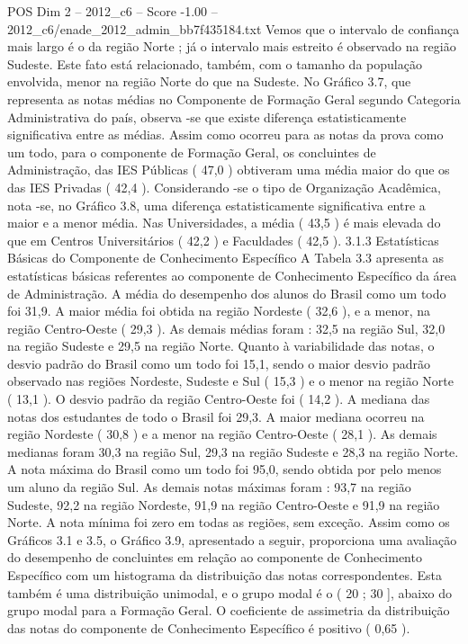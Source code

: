 \begin{textsample}{POS Dim 2 – 2012\_c6 – Score -1.00 – 2012\_c6/enade\_2012\_admin\_bb7f435184.txt}
Vemos que o intervalo de confiança mais largo é o da região Norte ; já o intervalo mais estreito é observado na região Sudeste.
Este fato está relacionado, também, com o tamanho da população envolvida, menor na região Norte do que na Sudeste.
No Gráfico 3.7, que representa as notas médias no Componente de Formação Geral segundo Categoria Administrativa do país, observa -se que existe diferença estatisticamente significativa entre as médias.
Assim como ocorreu para as notas da prova como um todo, para o componente de Formação Geral, os concluintes de Administração, das IES Públicas ( 47,0 ) obtiveram uma média maior do que os das IES Privadas ( 42,4 ).
Considerando -se o tipo de Organização Acadêmica, nota -se, no Gráfico 3.8, uma diferença estatisticamente significativa entre a maior e a menor média.
Nas Universidades, a média ( 43,5 ) é mais elevada do que em Centros Universitários ( 42,2 ) e Faculdades ( 42,5 ). 3.1.3 Estatísticas Básicas do Componente de Conhecimento Específico A Tabela 3.3 apresenta as estatísticas básicas referentes ao componente de Conhecimento Específico da área de Administração.
A média do desempenho dos alunos do Brasil como um todo foi 31,9.
A maior média foi obtida na região Nordeste ( 32,6 ), e a menor, na região Centro-Oeste ( 29,3 ).
As demais médias foram : 32,5 na região Sul, 32,0 na região Sudeste e 29,5 na região Norte.
Quanto à variabilidade das notas, o desvio padrão do Brasil como um todo foi 15,1, sendo o maior desvio padrão observado nas regiões Nordeste, Sudeste e Sul ( 15,3 ) e o menor na região Norte ( 13,1 ).
O desvio padrão da região Centro-Oeste foi ( 14,2 ).
A mediana das notas dos estudantes de todo o Brasil foi 29,3.
A maior mediana ocorreu na região Nordeste ( 30,8 ) e a menor na região Centro-Oeste ( 28,1 ).
As demais medianas foram 30,3 na região Sul, 29,3 na região Sudeste e 28,3 na região Norte.
A nota máxima do Brasil como um todo foi 95,0, sendo obtida por pelo menos um aluno da região Sul.
As demais notas máximas foram : 93,7 na região Sudeste, 92,2 na região Nordeste, 91,9 na região Centro-Oeste e 91,9 na região Norte.
A nota mínima foi zero em todas as regiões, sem exceção.
Assim como os Gráficos 3.1 e 3.5, o Gráfico 3.9, apresentado a seguir, proporciona uma avaliação do desempenho de concluintes em relação ao componente de Conhecimento Específico com um histograma da distribuição das notas correspondentes.
Esta também é uma distribuição unimodal, e o grupo modal é o ( 20 ; 30 ], abaixo do grupo modal para a Formação Geral.
O coeficiente de assimetria da distribuição das notas do componente de Conhecimento Específico é positivo ( 0,65 ).

\end{textsample}
